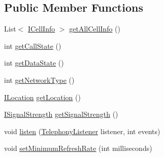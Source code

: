 \subsection*{Public Member Functions}
\begin{DoxyCompactItemize}
\item 
List$<$ \hyperlink{interfacecom_1_1qualoutdoor_1_1recorder_1_1telephony_1_1ICellInfo}{I\-Cell\-Info} $>$ \hyperlink{interfacecom_1_1qualoutdoor_1_1recorder_1_1telephony_1_1ITelephony_ac5f0965e1dfccd7207f49c277593acaa}{get\-All\-Cell\-Info} ()
\item 
int \hyperlink{interfacecom_1_1qualoutdoor_1_1recorder_1_1telephony_1_1ITelephony_a1b955c3be64a899274bf112d05c8d41a}{get\-Call\-State} ()
\item 
int \hyperlink{interfacecom_1_1qualoutdoor_1_1recorder_1_1telephony_1_1ITelephony_ab4135b0c4f01f0169b3a1ea63054b946}{get\-Data\-State} ()
\item 
int \hyperlink{interfacecom_1_1qualoutdoor_1_1recorder_1_1telephony_1_1ITelephony_af19331bac8e7317958047a5448274a28}{get\-Network\-Type} ()
\item 
\hyperlink{interfacecom_1_1qualoutdoor_1_1recorder_1_1telephony_1_1ILocation}{I\-Location} \hyperlink{interfacecom_1_1qualoutdoor_1_1recorder_1_1telephony_1_1ITelephony_acb95b0c4243cfca3c56776fc0ae3d18e}{get\-Location} ()
\item 
\hyperlink{interfacecom_1_1qualoutdoor_1_1recorder_1_1telephony_1_1ISignalStrength}{I\-Signal\-Strength} \hyperlink{interfacecom_1_1qualoutdoor_1_1recorder_1_1telephony_1_1ITelephony_a3454755b99a36692f8ed113144491760}{get\-Signal\-Strength} ()
\item 
void \hyperlink{interfacecom_1_1qualoutdoor_1_1recorder_1_1telephony_1_1ITelephony_a2bf33ee65f59c2100442f6ba33fac113}{listen} (\hyperlink{classcom_1_1qualoutdoor_1_1recorder_1_1telephony_1_1TelephonyListener}{Telephony\-Listener} listener, int events)
\item 
void \hyperlink{interfacecom_1_1qualoutdoor_1_1recorder_1_1telephony_1_1ITelephony_aaa52e62dfb4607e2f871e3ad0daeba23}{set\-Minimum\-Refresh\-Rate} (int milliseconds)
\end{DoxyCompactItemize}
